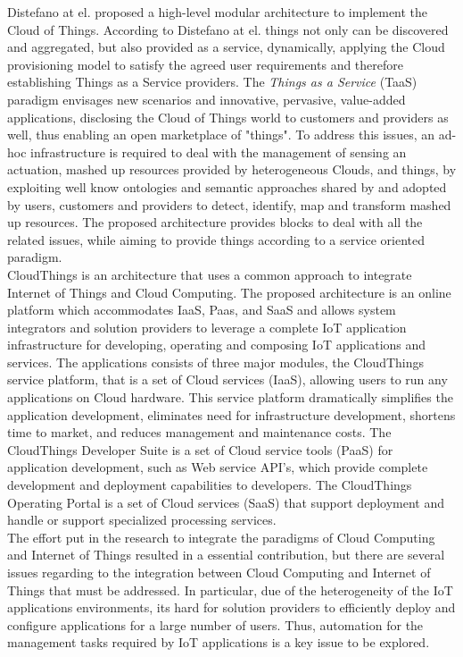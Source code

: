 \documentclass{../../llncs2e/llncs}
\begin{document}
  Distefano \cite{distefano2012enabling} at el. proposed a high-level modular architecture to implement the Cloud of Things. According to Distefano at el. things
  not only can be discovered and aggregated, but also provided as a service, dynamically, applying the Cloud provisioning model to satisfy the agreed
  user requirements and therefore establishing Things as a Service providers. The \textit{Things as a Service} (TaaS) paradigm envisages new scenarios
  and innovative, pervasive, value-added applications, disclosing the Cloud of Things world to customers and providers as well, thus enabling an open
  marketplace of "things". To address this issues, an ad-hoc infrastructure is required to deal with the management of sensing an actuation, mashed up
  resources provided by heterogeneous Clouds, and things, by exploiting well know ontologies and semantic approaches shared by and adopted by users,
  customers and providers to detect, identify, map and transform mashed up resources. The proposed architecture provides blocks to deal with all the
  related issues, while aiming to provide things according to a service oriented paradigm.\\

  CloudThings \cite{zhou2013cloudthings} is an architecture that uses a common approach to integrate Internet of Things and Cloud Computing. The proposed architecture
  is an online platform which accommodates IaaS, Paas, and SaaS and allows system integrators and solution providers to leverage a complete IoT application
  infrastructure for developing, operating and composing IoT applications and services. The applications consists of three major modules, the CloudThings
  service platform, that is a set of Cloud services (IaaS), allowing users to run any applications on Cloud hardware. This service platform dramatically
  simplifies the application development, eliminates need for infrastructure development, shortens time to market, and reduces management and maintenance
  costs. The CloudThings Developer Suite is a set of Cloud service tools (PaaS) for application development, such as Web service API's, which provide complete
  development and deployment capabilities to developers. The CloudThings Operating Portal is a set of Cloud services (SaaS) that support deployment and handle
  or support specialized processing services.\\

  The effort put in the research to integrate the paradigms of Cloud Computing and Internet of Things resulted in a essential contribution, but there are several
  issues regarding to the integration between Cloud Computing and Internet of Things that must be addressed. In particular, due of the heterogeneity of the IoT
  applications environments, its hard for solution providers to efficiently deploy and configure applications for a large number of users. Thus, automation for
  the management tasks required by IoT applications is a key issue to be explored.\\
\end{document}
